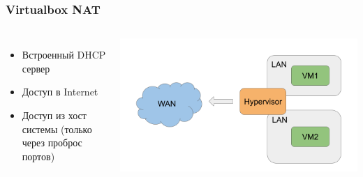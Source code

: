 \begin{frame}
\frametitle{Virtualbox NAT}
	\begin{columns}
        \begin{itemize}
            \item Встроенный DHCP сервер
            \item Доступ в Internet
            \item Доступ из хост системы (только через проброс портов)
        \end{itemize}
    \includegraphics[height=0.4\textheight]{../../slides/vbox/Virtualbox network NAT.png}
	\end{columns}
\end{frame}